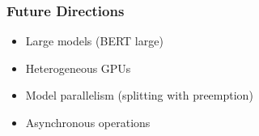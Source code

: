  \begin{frame}
    \frametitle{Future Directions}

    \begin{itemize}
      \item Large models (BERT large)
      \item Heterogeneous GPUs
      \item Model parallelism (splitting with preemption)
      \item Asynchronous operations
    \end{itemize}
  \end{frame}


